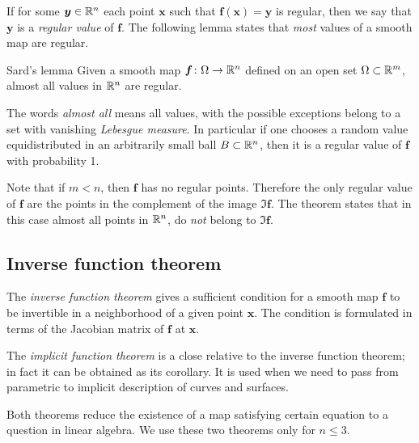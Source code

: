 If for some $\bm{y}\in \mathbb{R}^n$ each point $\bm{x}$ such that $\bm{f}(\bm{x})=\bm{y}$ is regular,
then we say that $\bm{y}$ is a \emph{regular value} of $\bm{f}$.
The following lemma states that {}\emph{most} values of a smooth map are regular.

\begin{thm}{Sard's lemma}\label{lem:sard}
Given a smooth map $\bm{f}\colon \Omega \z\to \RR^n$ defined on an open set $\Omega\subset \mathbb{R}^m$, almost all values in $\mathbb{R}^n$ are regular.
\end{thm}

The words \emph{almost all} means all values, with the possible exceptions belong to a set with vanishing {}\emph{Lebesgue measure}.
In particular if one chooses a random value equidistributed in an arbitrarily small ball $B\subset \mathbb{R}^n$, then it is a regular value of $\bm{f}$ with probability 1.

Note that if $m<n$, then $\bm{f}$ has no regular points.
Therefore the only regular value of $\bm{f}$ are the points in the complement of the image $\Im \bm{f}$.
The theorem states that in this case almost all points in $\mathbb{R}^n$, do {}\emph{not} belong to $\Im \bm{f}$.


\subsection*{Inverse function theorem}

The \emph{inverse function theorem} gives a sufficient condition for a smooth map $\bm{f}$ to be invertible in a neighborhood of a given point $\bm{x}$.
The condition is formulated in terms of the Jacobian matrix of $\bm{f}$ at $\bm{x}$.

The \emph{implicit function theorem} is a close relative to the inverse function theorem;
in fact it can be obtained as its corollary.
It is used when we need to pass from parametric to implicit description of curves and surfaces.

Both theorems reduce the existence of a map satisfying certain equation to a question in linear algebra.
We use these two theorems only for $n\le 3$.

